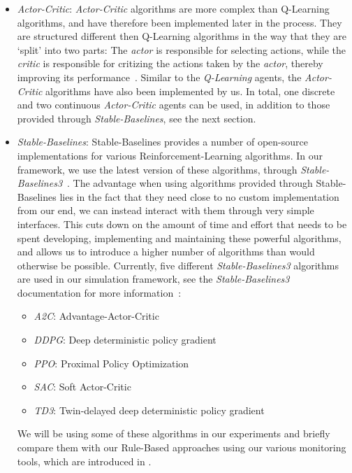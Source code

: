 \begin{enumerate}
\begin{itemize}
		      \item \emph{Actor-Critic}: \emph{Actor-Critic} algorithms are more complex than Q-Learning algorithms, and have therefore been implemented later in the process. They are structured different then Q-Learning algorithms in the way that they are `split' into two parts: The \emph{actor} is responsible for selecting actions, while the \emph{critic} is responsible for critizing the actions taken by the \emph{actor}, thereby improving its performance~\cite{ActorCritic}. Similar to the \emph{Q-Learning} agents, the \emph{Actor-Critic} algorithms have also been implemented by us. In total, one discrete and two continuous \emph{Actor-Critic} agents can be used, in addition to those provided through \emph{Stable-Baselines}, see the next section.
		      \item \emph{Stable-Baselines}: Stable-Baselines provides a number of open-source implementations for various Reinforcement-Learning algorithms. In our framework, we use the latest version of these algorithms, through \emph{Stable-Baselines3}~\cite{StableBaselines3}. The advantage when using algorithms provided through Stable-Baselines lies in the fact that they need close to no custom implementation from our end, we can instead interact with them through very simple interfaces. This cuts down on the amount of time and effort that needs to be spent developing, implementing and maintaining these powerful algorithms, and allows us to introduce a higher number of algorithms than would otherwise be possible. Currently, five different \emph{Stable-Baselines3} algorithms are used in our simulation framework, see the \emph{Stable-Baselines3} documentation for more information~\cite{StableBaselines3Algorithms}:
		            \begin{itemize}
			            \item \emph{A2C}: Advantage-Actor-Critic
			            \item \emph{DDPG}: Deep deterministic policy gradient
			            \item \emph{PPO}: Proximal Policy Optimization
			            \item \emph{SAC}: Soft Actor-Critic
			            \item \emph{TD3}: Twin-delayed deep deterministic policy gradient
		            \end{itemize}
		            We will be using some of these algorithms in our experiments and briefly compare them with our Rule-Based approaches using our various monitoring tools, which are introduced in .
	      \end{itemize}
\end{enumerate}


